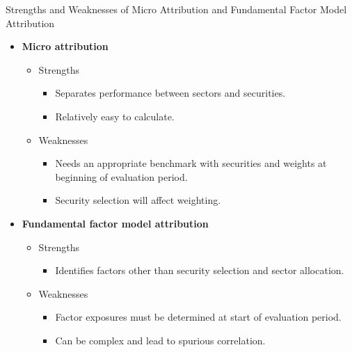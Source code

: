 \documentclass[../custom]{flashcards}
\begin{document}
\begin{flashcard}[\studyArea]{Strengths and Weaknesses of Micro Attribution and Fundamental Factor Model Attribution}
    \begin{itemize}
        \item \textbf{Micro attribution}
            \begin{itemize}
                \item Strengths
                    \begin{itemize}
                        \item Separates performance between sectors and securities.
                        \item Relatively easy to calculate.
                    \end{itemize}
                \item Weaknesses
                    \begin{itemize}
                        \item Needs an appropriate benchmark with securities and weights at beginning of evaluation period.
                        \item Security selection will affect weighting.
                    \end{itemize}
            \end{itemize}
        \item \textbf{Fundamental factor model attribution}
            \begin{itemize}
                \item Strengths
                    \begin{itemize}
                        \item Identifies factors other than security selection and sector allocation.
                    \end{itemize}
                \item Weaknesses
                    \begin{itemize}
                        \item Factor exposures must be determined at start of evaluation period.
                        \item Can be complex and lead to spurious correlation.
                    \end{itemize}
            \end{itemize}
    \end{itemize}
\end{flashcard}
\end{document}
